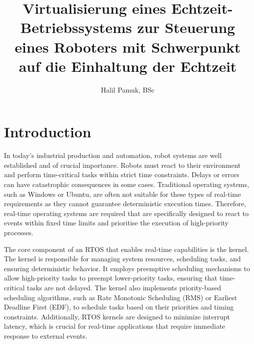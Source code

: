 \documentclass[MMR,Master,english]{twbook}
\title{Virtualisierung eines Echtzeit-Betriebssystems zur Steuerung eines Roboters mit Schwerpunkt auf die
Einhaltung der Echtzeit}
\author{Halil Pamuk, BSc}
\begin{document}
\maketitle
%
%
%



\chapter{Introduction}\label{cha:introduction}
In today's industrial production and automation, robot systems are well established and of crucial importance. Robots must react to their environment and perform time-critical tasks within strict time constraints. Delays or errors can have catastrophic consequences in some cases. Traditional operating systems, such as Windows or Ubuntu, are often not suitable for these types of real-time requirements as they cannot guarantee deterministic execution times. Therefore, real-time operating systems are required that are specifically designed to react to events within fixed time limits and prioritise the execution of high-priority processes.

\bigskip \noindent The core component of an RTOS that enables real-time capabilities is the kernel. The kernel is responsible for managing system resources, scheduling tasks, and ensuring deterministic behavior. It employs preemptive scheduling mechanisms to allow high-priority tasks to preempt lower-priority tasks, ensuring that time-critical tasks are not delayed. The kernel also implements priority-based scheduling algorithms, such as Rate Monotonic Scheduling (RMS) or Earliest Deadline First (EDF), to schedule tasks based on their priorities and timing constraints. Additionally, RTOS kernels are designed to minimize interrupt latency, which is crucial for real-time applications that require immediate response to external events.
\end{document}
